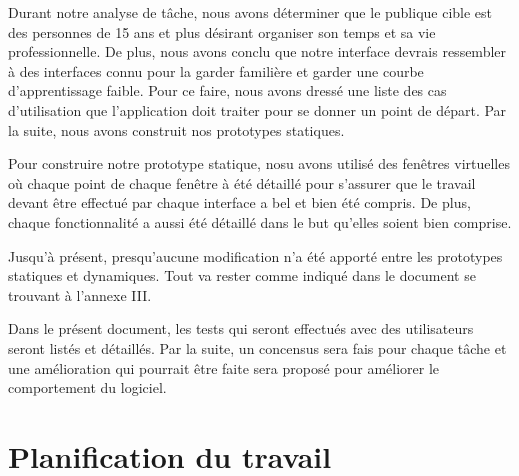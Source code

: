 \documentclass[letterpaper, oneside, 12pt, these, creativecommons]{thETS}
\begin{document}
Durant notre analyse de tâche, nous avons déterminer que le publique cible est des personnes de 15 ans et plus désirant organiser son temps et sa vie professionnelle. De plus, nous avons conclu que notre interface devrais ressembler à des interfaces connu pour la garder familière et garder une courbe d'apprentissage faible. Pour ce faire, nous avons dressé une liste des cas d'utilisation que l'application doit traiter pour se donner un point de départ. Par la suite, nous avons construit nos prototypes statiques.

Pour construire notre prototype statique, nosu avons utilisé des fenêtres virtuelles où chaque point de chaque fenêtre à été détaillé pour s'assurer que le travail devant être effectué par chaque interface a bel et bien été compris. De plus, chaque fonctionnalité a aussi été détaillé dans le but qu'elles soient bien comprise.

Jusqu'à présent, presqu'aucune modification n'a été apporté entre les prototypes statiques et dynamiques. Tout va rester comme indiqué dans le document se trouvant à l'annexe III.

Dans le présent document, les tests qui seront effectués avec des utilisateurs seront listés et détaillés. Par la suite, un concensus sera fais pour chaque tâche et une amélioration qui pourrait être faite sera proposé pour améliorer le comportement du logiciel.

\chapter{Planification du travail}
\end{document}
